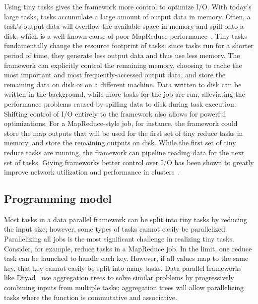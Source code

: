 Using tiny tasks gives the framework more control to optimize I/O.
With
today's large tasks, tasks accumulate a large amount of output data in memory.
Often, a task's output data will overflow the available space in memory
and spill onto a disk, which is a well-known cause of poor MapReduce
performance~\cite{lipcon2012optimizing}. Tiny tasks fundamentally change the
resource footprint of tasks: since tasks run for a shorter period of time,
they generate less output data and thus use less memory. The framework can
explicitly control the remaining memory, choosing to cache the most important
and most frequently-accessed output data, and store the remaining data on disk
or on a different machine. Data written to disk can be written in the
background, while more tasks for the job are run, alleviating the performance
problems caused by spilling data to disk during task execution.
Shifting control of I/O entirely to the framework also allows for
powerful optimizations.  For a MapReduce-style job, for instance, the
framework could store the map outputs that will be used for the first set of
tiny reduce tasks in memory, and store the remaining outputs on disk. While
the first set of tiny reduce tasks are running, the framework can pipeline
reading data for the next set of tasks.  Giving frameworks better control over
I/O has been shown
to greatly improve network utilization and performance in
clusters~\cite{chowdhury2011managing, chowdhury2012coflow}.

\subsection{Programming model}
\label{sec:prog}
Most tasks in a data parallel framework can be split into tiny tasks by
reducing the input size; however, some types of tasks cannot easily be
parallelized. Parallelizing all jobs is the most significant challenge
in realizing tiny tasks. 
Consider, for example, reduce tasks in a MapReduce job. In the limit,
one reduce task can be launched to handle each key. However, if all
values map to the same key, that key cannot easily be split into many
tasks.
Data parallel frameworks like Dryad~\cite{yu2008dryadlinq} use aggregation trees to solve
similar problems by progressively combining inputs from multiple tasks;
aggregation trees will allow parallelizing tasks where the function
is commutative and associative.

